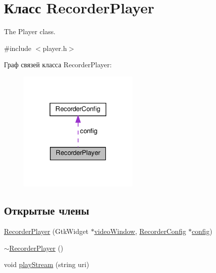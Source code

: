 \hypertarget{class_recorder_player}{}\section{Класс Recorder\+Player}
\label{class_recorder_player}


The Player class.  




{\ttfamily \#include $<$player.\+h$>$}



Граф связей класса Recorder\+Player\+:\nopagebreak
\begin{figure}[H]
\begin{center}
\leavevmode
\includegraphics[width=165pt]{class_recorder_player__coll__graph}
\end{center}
\end{figure}
\subsection*{Открытые члены}
\begin{DoxyCompactItemize}
\item 
\hyperlink{class_recorder_player_a12a01ff15528f155880500982849f800}{Recorder\+Player} (Gtk\+Widget $\ast$\hyperlink{class_recorder_player_a88e14542c46c550d3366ce20c047dcef}{video\+Window}, \hyperlink{class_recorder_config}{Recorder\+Config} $\ast$\hyperlink{class_recorder_player_a9ad3716db3ce5c242a94eba40f74e059}{config})
\item 
\hyperlink{class_recorder_player_af01cf1dba228330537e610a9de7decca}{$\sim$\+Recorder\+Player} ()
\item 
void \hyperlink{class_recorder_player_aa7f1f74d987ad24366fddb6444d82b63}{play\+Stream} (string uri)
\end{DoxyCompactItemize}
